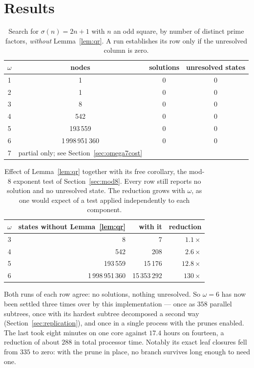 \documentclass[11pt]{amsart}
\theoremstyle{remark}
\begin{document}
\section{Results}\label{sec:results}

\begin{table}[h]
\centering
\begin{tabular}{cccc}
\toprule
$\omega$ & nodes & solutions & unresolved states \\
\midrule
1 & 1 & 0 & 0 \\
2 & 1 & 0 & 0 \\
3 & 8 & 0 & 0 \\
4 & 542 & 0 & 0 \\
5 & 193\,559 & 0 & 0 \\
6 & 1\,998\,951\,360 & 0 & 0 \\
7 & partial only; see Section~\ref{sec:omega7cost} & & \\
\bottomrule
\end{tabular}
\caption{Search for $\sigma(n) = 2n + 1$ with $n$ an odd square, by number of
distinct prime factors, \emph{without} Lemma~\ref{lem:qr}. A run establishes its
row only if the unresolved column is zero.}
\end{table}

\begin{table}[h]
\centering
\begin{tabular}{crrr}
\toprule
$\omega$ & states without Lemma~\ref{lem:qr} & with it & reduction \\
\midrule
3 & 8 & 7 & $1.1\times$ \\
4 & 542 & 208 & $2.6\times$ \\
5 & 193\,559 & 15\,176 & $12.8\times$ \\
6 & 1\,998\,951\,360 & 15\,353\,292 & $130\times$ \\
\bottomrule
\end{tabular}
\caption{Effect of Lemma~\ref{lem:qr} together with its free corollary, the
mod-8 exponent test of Section~\ref{sec:mod8}. Every row still reports no
solution and no unresolved state. The reduction grows with $\omega$, as one would
expect of a test applied independently to each component.}
\end{table}

Both runs of each row agree: no solutions, nothing unresolved. So $\omega = 6$
has now been settled three times over by this implementation --- once as $358$
parallel subtrees, once with its hardest subtree decomposed a second way
(Section~\ref{sec:replication}), and once in a single process with the prunes
enabled. The last took eight minutes on one core against $17.4$ hours on
fourteen, a reduction of about $288$ in total processor time. Notably its exact
leaf closures fell from $335$ to zero: with the prune in place, no branch
survives long enough to need one.
\end{document}
